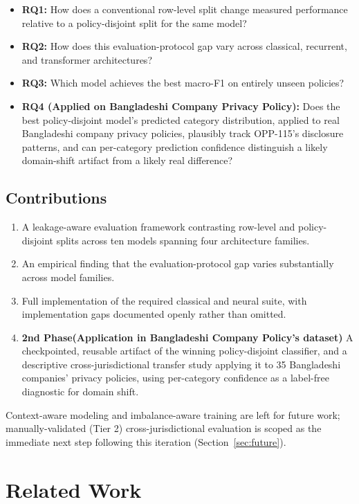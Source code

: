 \documentclass[11pt]{article}
\begin{document}
\begin{itemize}
\item \textbf{RQ1:} How does a conventional row-level split change measured performance relative to a policy-disjoint split for the same model?
\item \textbf{RQ2:} How does this evaluation-protocol gap vary across classical, recurrent, and transformer architectures?
\item \textbf{RQ3:} Which model achieves the best macro-F1 on entirely unseen policies?
\item \textbf{RQ4 (Applied on Bangladeshi Company Privacy Policy):} Does the best policy-disjoint model's predicted category distribution, applied to real Bangladeshi company privacy policies, plausibly track OPP-115's disclosure patterns, and can per-category prediction confidence distinguish a likely domain-shift artifact from a likely real difference?
\end{itemize}

\subsection{Contributions}

\begin{enumerate}
\item A leakage-aware evaluation framework contrasting row-level and policy-disjoint splits across ten models spanning four architecture families.
\item An empirical finding that the evaluation-protocol gap varies substantially across model families.
\item Full implementation of the required classical and neural suite, with implementation gaps documented openly rather than omitted.
\item \textbf{2nd Phase(Application in Bangladeshi Company Policy's dataset)} A checkpointed, reusable artifact of the winning policy-disjoint classifier, and a descriptive cross-jurisdictional transfer study applying it to 35 Bangladeshi companies' privacy policies, using per-category confidence as a label-free diagnostic for domain shift.
\end{enumerate}

Context-aware modeling and imbalance-aware training are left for future work; manually-validated (Tier 2) cross-jurisdictional evaluation is scoped as the immediate next step following this iteration (Section~\ref{sec:future}).

\section{Related Work}
\end{document}
